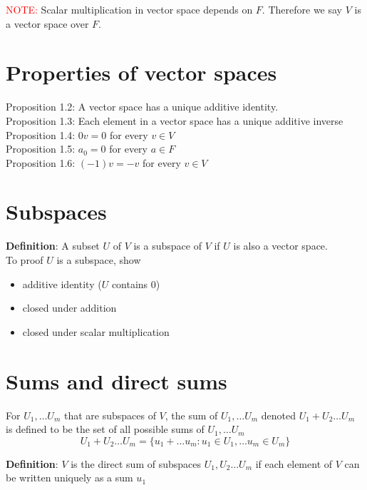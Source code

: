 \documentclass[a4paper, 10pt]{report}
\begin{document}
\textcolor{red}{NOTE:} Scalar multiplication in vector space depends on $F$. Therefore we say $V$ is a vector space over $F$. 

\section{Properties of vector spaces}

Proposition 1.2: A vector space has a unique additive identity. \\
Proposition 1.3: Each element in a vector space has a unique additive inverse\\
Proposition 1.4: $0v = 0$ for every  $v \in V$\\
Proposition 1.5: $a_0 = 0$ for every  $a \in F$\\
Proposition 1.6: $(-1) v = -v $ for every  $v \in V$\\

\section{Subspaces}
\begin{framed}
   \textbf{Definition}: A subset $U$ of $V$ is a subspace of $V$ if $U$ is also a vector space. \\

   To proof $U$ is a subspace, show
   \begin{itemize}
      \item additive identity ($U$ contains 0) 
      \item closed under addition
      \item closed under scalar multiplication
     
   \end{itemize}
\end{framed}

\section{Sums and direct sums}

For $U_1, \hdots U_m$ that are subspaces of $V$, the sum of $U_1, \hdots U_m$ denoted $U_1 + U_2 \hdots U_m$ is defined to be the set of all possible sums of $U_1, \hdots U_m$ 
\[
  U_1 + U_2 \hdots U_m = \{  u_1 + \hdots u_m: u_1 \in U_1, \hdots u_m \in U_m \} 
\] 

\begin{framed}
   \textbf{Definition}: $V$ is the direct sum of subspaces $U_1, U_2 \hdots U_m$ if each element of $V$ can be written uniquely as a sum $u_1 $
\end{framed}
\end{document}
